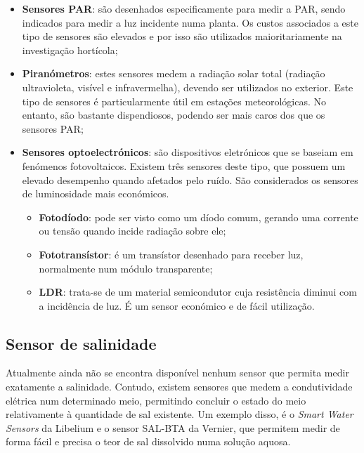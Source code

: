 \begin{itemize}
	\item \textbf{Sensores \ac{PAR}}: são desenhados especificamente para medir a \ac{PAR}, sendo indicados para medir a luz incidente numa planta. Os custos associados a este tipo de sensores são elevados e por isso são utilizados maioritariamente na investigação hortícola; 
	


	
	
	
	\item \textbf{Piranómetros}: estes sensores medem a radiação solar total (radiação ultravioleta, visível e infravermelha), devendo ser utilizados no exterior. Este tipo de sensores é particularmente útil em estações meteorológicas. No entanto, são bastante dispendiosos, podendo ser mais caros dos que os sensores \ac{PAR}; 
	
	
	
	
	\item \textbf{Sensores optoelectrónicos}: são dispositivos eletrónicos que se baseiam em fenómenos fotovoltaicos. Existem três sensores deste tipo, que possuem um elevado desempenho quando afetados pelo ruído. São considerados os sensores de luminosidade mais económicos.  
	 
		\begin{itemize}
			\item \textbf{Fotodíodo}: pode ser visto como um díodo comum, gerando uma corrente ou tensão quando incide radiação sobre ele; 
			\item \textbf{Fototransístor}: é um transístor desenhado para receber luz, normalmente num módulo transparente; 
			\item \textbf{\ac{LDR}}: trata-se de um material semicondutor cuja resistência diminui com a incidência de luz. É um sensor económico e de fácil utilização. 
		\end{itemize}
	
\end{itemize}





\subsection{Sensor de salinidade}


Atualmente ainda não se encontra disponível nenhum sensor que permita medir exatamente a salinidade. Contudo, existem sensores que medem a condutividade elétrica num determinado meio, permitindo concluir o estado do meio relativamente à quantidade de sal existente. 
Um exemplo disso, é o \textit{Smart Water Sensors} da Libelium\cite{World2014}  e o sensor SAL-BTA da Vernier\cite{sall}, que permitem medir de forma fácil e precisa o teor de sal dissolvido numa solução aquosa.




